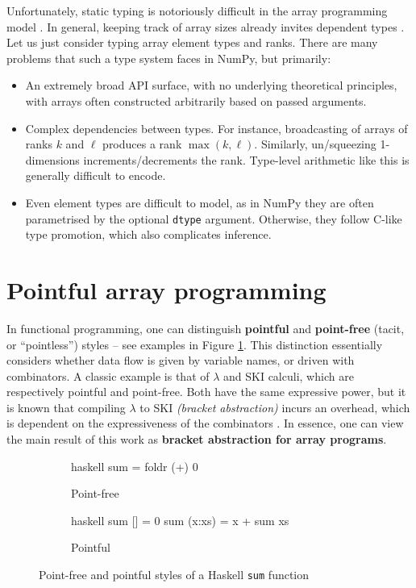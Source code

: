 Unfortunately, static typing is notoriously difficult in the array programming model \cite{liu2020type}. In general, keeping track of array sizes already invites dependent types \cite{henriksen2021towards}. Let us just consider typing array element types and ranks. There are many problems that such a type system faces in NumPy, but primarily:
\begin{itemize}
    \item An extremely broad API surface, with no underlying theoretical principles, with arrays often constructed arbitrarily based on passed arguments.
    \item Complex dependencies between types. For instance, broadcasting of arrays of ranks $k$ and $\ell$ produces a rank $\max(k, \ell)$. Similarly, un/squeezing 1-dimensions increments/decrements the rank. Type-level arithmetic like this is generally difficult to encode.
    \item Even element types are difficult to model, as in NumPy they are often parametrised by the optional \texttt{dtype} argument. Otherwise, they follow C-like type promotion, which also complicates inference.
\end{itemize}

\section{Pointful array programming}
\label{pointful-array-programming}

In functional programming, one can distinguish \textbf{pointful} and \textbf{point-free} (tacit, or ``pointless'') styles -- see examples in Figure \ref{fig:point-haskell}. This distinction essentially considers whether data flow is given by variable names, or driven with combinators. A classic example is that of $\lambda$ and SKI calculi, which are respectively pointful and point-free. Both have the same expressive power, but it is known that compiling $\lambda$ to SKI \textit{(bracket abstraction)} incurs an overhead, which is dependent on the expressiveness of the combinators \cite{lachowski2018complexity}. 
In essence, one can view the main result of this work as \textbf{bracket abstraction for array programs}.

\begin{figure}[h]
\centering
\begin{subfigure}{.3\textwidth}
  \centering
    \begin{cminted}{haskell}
sum = foldr (+) 0
    \end{cminted}
      \caption{Point-free}
\end{subfigure}%
\begin{subfigure}{.3\textwidth}
  \centering
  \begin{cminted}{haskell}
sum [] = 0
sum (x:xs) = x + sum xs
  \end{cminted}
  \caption{Pointful}
\end{subfigure}
\caption{Point-free and pointful styles of a Haskell \texttt{sum} function}
\label{fig:point-haskell}
\end{figure}


